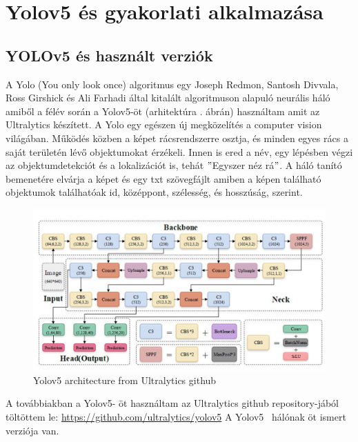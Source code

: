 \documentclass[12pt,oneside,a4paper]{article}
\theoremstyle{remark}
\begin{document}
\section{Yolov5 és gyakorlati alkalmazása}\label{sec:yolov5-es-gyakorlati-alkalmazasa}

\subsection{YOLOv5 és használt verziók}\label{subsec:yolov5-es-hasznalt-verziok}

A Yolo (You only look once)  algoritmus egy Joseph Redmon, Santosh Divvala, Ross Girshick és Ali Farhadi által kitalált
algoritmuson alapuló neurális háló amiből a félév során a Yolov5-öt (arhitektúra . ábrán) használtam
amit az Ultralytics készített.
A Yolo egy egészen új megközelítés a computer vision világában.
Működés közben a képet rácsrendszerre osztja, és minden egyes rács a saját területén lévő objektumokat érzékeli.
Innen is ered a név, egy lépésben végzi az objektumdetekciót és a lokalizációt is, tehát \("\)Egyszer néz rá\("\).
 A háló tanító bemenetére elvárja a képet és egy txt szövegfájlt amiben a képen található objektumok találhatóak id,
középpont, szélesség, és hosszúság, szerint.

\begin{figure}[ht]
    \centering
    \includegraphics[width=1
    \linewidth]{architecture}
    \caption{\label{fig:architecture}Yolov5 architecture from Ultralytics github}
\end{figure}
\vspace{3mm}
\noindent A továbbiakban a Yolov5- öt használtam az Ultralytics github repository-jából töltöttem le:
\vspace{1mm}
\noindent \href{https://github.com/ultralytics/yolov5}{https://github.com/ultralytics/yolov5}
\vspace{2mm}
\noindent A Yolov5~\cite{yolov5github} hálónak öt ismert verziója van.
\end{document}
